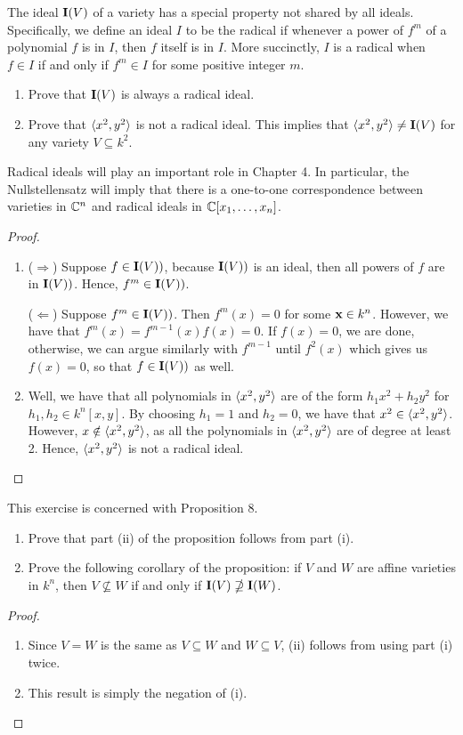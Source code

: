\begin{exercise}{8}
The ideal $\mathbf{I}(V)$ of a variety has a special property not shared by all ideals. Specifically, we define an ideal $I$ to be the radical if whenever a power of $f^m$ of a polynomial $f$ is in $I$, then $f$ itself is in $I$. More succinctly, $I$ is a radical when $f\in I$ if and only if $f^m\in I$ for some positive integer $m$.
\begin{enumerate}
    \item Prove that $\mathbf{I}(V)$ is always a radical ideal.
    \item Prove that $\langle x^2,y^2\rangle$ is not a radical ideal. This implies that $\langle x^2,y^2\rangle\neq \mathbf{I}(V)$ for any variety $V\subseteq k^2$.
\end{enumerate}
Radical ideals will play an important role in Chapter 4. In particular, the Nullstellensatz will imply that there is a one-to-one correspondence between varieties in $\mathbb{C}^n$ and radical ideals in $\mathbb{C}[x_1,\dots,x_n]$.
\end{exercise}
\begin{proof}
\begin{enumerate}
    \item ($\Rightarrow$) Suppose $f\in\mathbf{I}(V))$, because $\mathbf{I}(V))$ is an ideal, then all powers of $f$ are in $\mathbf{I}(V))$. Hence, $f^m\in\mathbf{I}(V))$.

    ($\Leftarrow$) Suppose $f^m\in\mathbf{I}(V))$. Then $f^m(x)=0$ for some $\mathbf{x}\in k^n$. However, we have that $f^m(x) =f^{m-1}(x)f(x)=0$. If $f(x)=0$, we are done, otherwise, we can argue similarly with $f^{m-1}$ until $f^2(x)$ which gives us $f(x)=0$, so that $f\in\mathbf{I}(V))$ as well.
    \item Well, we have that all polynomials in $\langle x^2,y^2\rangle$ are of the form $h_1x^2+h_2y^2$ for $h_1,h_2\in k^n[x,y]$. By choosing $h_1=1$ and $h_2=0$, we have that $x^2\in\langle x^2,y^2\rangle$. However, $x\notin\langle x^2,y^2\rangle$, as all the polynomials in $\langle x^2,y^2\rangle$ are of degree at least 2. Hence, $\langle x^2,y^2\rangle$ is not a radical ideal.
\end{enumerate}
\end{proof}

\begin{exercise}{14}
This exercise is concerned with Proposition 8.
\begin{enumerate}
    \item Prove that part (ii) of the proposition follows from part (i).
    \item Prove the following corollary of the proposition: if $V$ and $W$ are affine varieties in $k^n$, then $V\nsubseteq W$ if and only if $\mathbf{I}(V)\nsupseteq\mathbf{I}(W)$.
\end{enumerate}
\end{exercise}
\begin{proof}
\begin{enumerate}
    \item Since $V=W$ is the same as $V\subseteq W$ and $W\subseteq V$, (ii) follows from using part (i) twice.
    \item This result is simply the negation of (i).
\end{enumerate}
\end{proof}

